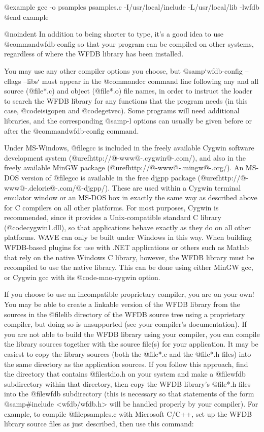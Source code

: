 {@example
gcc -o psamples psamples.c -I/usr/local/include -L/usr/local/lib -lwfdb
@end example

@noindent
In addition to being shorter to type, it's a good idea to use
@command{wfdb-config} so that your program can be compiled on other systems,
regardless of where the WFDB library has been installed.

You may use any other compiler options you choose, but
@samp{`wfdb-config --cflags --libs`} must appear in the @command{cc} command
line following any and all source (@file{*.c}) and object (@file{*.o}) file
names, in order to instruct the loader to search the WFDB library for any
functions that the program needs (in this case, @code{isigopen} and
@code{getvec}).  Some programs will need additional libraries, and the
corresponding @samp{-l} options can usually be given before or after the
@command{wfdb-config} command.

Under MS-Windows, @file{gcc} is included in the freely available Cygwin
software development system (@uref{http://@-www@-.cygwin@-.com/}), and also in
the freely available MinGW package (@uref{http://@-www@-.mingw@-.org/}).  An
MS-DOS version of @file{gcc} is available in the free djgpp package
(@uref{http://@-www@-.delorie@-.com/@-djgpp/}). These are used within a Cygwin
terminal emulator window or an MS-DOS box in exactly the same way as described
above for C compilers on all other platforms.  For most purposes, Cygwin is
recommended, since it provides a Unix-compatible standard C library
(@code{cygwin1.dll}), so that applications behave exactly as they do on all
other platforms.  WAVE can only be built under Windows in this way.  When
building WFDB-based plugins for use with .NET applications or others such as
Matlab that rely on the native Windows C library, however, the WFDB library
must be recompiled to use the native library.  This can be done using either
MinGW gcc, or Cygwin gcc with its @code{-mno-cygwin} option.

If you choose to use an incompatible proprietary compiler, you are on
your own!  You may be able to create a linkable version of the WFDB
library from the sources in the @file{lib} directory of the WFDB source
tree using a proprietary compiler, but doing so is unsupported (see your
compiler's documentation).  If you are not able to build the WFDB
library using your compiler, you can compile the library sources
together with the source file(s) for your application.  It may be
easiest to copy the library sources (both the @file{*.c} and the
@file{*.h} files) into the same directory as the application sources.
If you follow this approach, find the directory that contains @file{stdio.h}
on your system and make a @file{wfdb} subdirectory within that directory,
then copy the WFDB library's @file{*.h} files into the @file{wfdb}
subdirectory (this is necessary so that statements of the form
@samp{#include <wfdb/wfdb.h>} will be handled properly by your compiler).
For example, to compile @file{psamples.c} with Microsoft C/C++, set up
the WFDB library source files as just described, then use this command:

}
